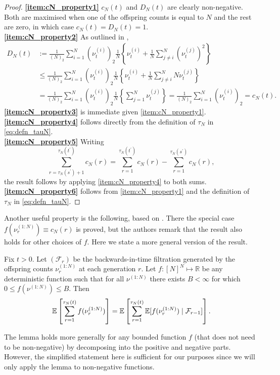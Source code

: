 \begin{proof}
\textbf{\ref{item:cN_property1}}  $c_N(t)$ and $D_N(t)$ are clearly non-negative. Both are maximised when one of the offspring counts is equal to $N$ and the rest are zero, in which case $c_N(t) = D_N(t) = 1$.\\
\textbf{\ref{item:cN_property2}} As outlined in \textcite[p.9]{koskela2018},
\begin{align*}
D_N(t) &:= \frac{1}{(N)_2} \sum_{i=1}^N (\nu_t^{(i)})_2 \frac{1}{N} \left\{  \nu_t^{(i)} + \frac{1}{N} \sum_{j\neq i}^N (\nu_t^{(j)})^2 \right\} \\
&\leq \frac{1}{(N)_2} \sum_{i=1}^N (\nu_t^{(i)})_2 \frac{1}{N} \left\{  \nu_t^{(i)} + \frac{1}{N} \sum_{j\neq i}^N N \nu_t^{(j)} \right\} \\
&= \frac{1}{(N)_2} \sum_{i=1}^N (\nu_t^{(i)})_2 \frac{1}{N} \left\{ \sum_{j =1}^N \nu_t^{(j)} \right\}
= \frac{1}{(N)_2} \sum_{i=1}^N (\nu_t^{(i)})_2
= c_N(t) .
\end{align*}
\textbf{\ref{item:cN_property3}} is immediate given \ref{item:cN_property1}.\\
\textbf{\ref{item:cN_property4}} follows directly from the definition of $\tau_N$ in \eqref{eq:defn_tauN}.\\
\textbf{\ref{item:cN_property5}} Writing
\begin{equation*}
\sum_{r=\tau_N(s^\prime)+1}^{\tau_N(t^\prime)} c_N(r)
= \sum_{r=1}^{\tau_N(t^\prime)} c_N(r) 
        - \sum_{r=1}^{\tau_N(s^\prime)} c_N(r) ,
\end{equation*}
the result follows by applying \ref{item:cN_property4} to both sums.\\
\textbf{\ref{item:cN_property6}} follows from \ref{item:cN_property1} and the definition of $\tau_N$ in \eqref{eq:defn_tauN}.
\end{proof}


Another useful property is the following, based on \textcite[Lemma 2]{koskela2018}. There the special case $f(\nu_r^{(1:N)}) \equiv c_N(r)$ is proved, but the authors remark that the result also holds for other choices of $f$. Here we state a more general version of the result.

\begin{lemma}\label{thm:kjjslemma2}
Fix $t>0$.
Let $(\mathcal{F}_r)$ be the backwards-in-time filtration generated by the offspring counts $\nu_r^{(1:N)}$ at each generation $r$.
Let $f : [N]^N \mapsto \mathbb{R}$ be any deterministic function such that for all $\nu^{(1:N)}$ there exists $B<\infty$ for which $0\leq f(\nu^{(1:N)}) \leq B$.
Then
\begin{equation*}
\mathbb{E} \left[ \sum_{r=1}^{\tau_N(t)} f(\nu_r^{(1:N)}) \right] 
= \mathbb{E} \left[ \sum_{r=1}^{\tau_N(t)} \mathbb{E} [ f(\nu_r^{(1:N)}) \mid \mathcal{F}_{r-1} ] \right] .
\end{equation*}
\end{lemma}
The lemma holds more generally for any bounded function $f$ (that does not need to be non-negative) by decomposing into the positive and negative parts. However, the simplified statement here is sufficient for our purposes since we will only apply the lemma to non-negative functions.


